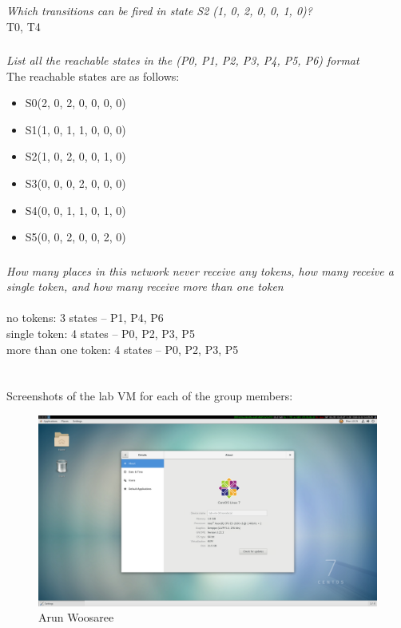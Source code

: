 \documentclass[letterpaper]{article}
\begin{document}
\subsubsection{}
\textit{Which transitions can be fired in state S2 (1, 0, 2, 0, 0, 1, 0)?}\\

T0, T4

\subsubsection{}
\textit{List all the reachable states in the (P0, P1, P2, P3, P4, P5, P6) format}\\

The reachable states are as follows:
\begin{itemize}
 \item S0(2, 0, 2, 0, 0, 0, 0)
 \item S1(1, 0, 1, 1, 0, 0, 0)
 \item S2(1, 0, 2, 0, 0, 1, 0)
 \item S3(0, 0, 0, 2, 0, 0, 0)
 \item S4(0, 0, 1, 1, 0, 1, 0)
 \item S5(0, 0, 2, 0, 0, 2, 0)
\end{itemize}

\subsubsection{}
\textit{How many places in this network never receive any tokens, how many receive a single token, and how many receive more than one token}\\
\noindent\\
no tokens: 3 states -- P1, P4, P6\\
single token: 4 states -- P0, P2, P3, P5\\ %
more than one token: 4 states -- P0, P2, P3, P5\\


\section{}

Screenshots of the lab VM for each of the group members:

\begin{figure}[H]
 \centering
 \includegraphics[width=\textwidth]{arun.png}
 \caption{Arun Woosaree}
\end{figure}
\end{document}

